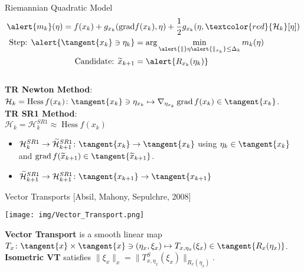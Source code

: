 \documentclass{beamer}
\begin{document}
\begin{frame}{Riemannian Quadratic Model}
    \begin{align*}
        \alert{m_k}(\eta) = f(x_k) + g_{x_k}(\operatorname{grad} & f(x_k), \eta) + \frac{1}{2} g_{x_k}(\eta, \textcolor{red}{\mathcal{H}_k} [\eta]) \\
        \text{Step: } \alert{\tangent{x_k} \ni \eta_k} & = \arg \min_{\alert{\lVert} \eta \alert{\rVert_{x_k}} \leq \Delta_k} m_k(\eta) \\
        \text{Candidate: } \widetilde{x}_{k+1} & = \alert{R_{x_k}(\eta_k)}
    \end{align*} \\[0.5\baselineskip]
    \textbf{TR Newton Method}: \\
    $\mathcal{H}_k = \operatorname{Hess} f(x_k) \colon \tangent{x_k} \ni \eta_{x_k} \mapsto \nabla_{\eta_{x_k}} \operatorname{grad} f(x_k) \in \tangent{x_k}$. \\[0.5\baselineskip]
	\textbf{TR SR1 Method}: \\
    $\mathcal{H}_k = \mathcal{H}^{SR1}_k \approx \operatorname{Hess} f(x_k)$ \\[-0.1\baselineskip]
    \begin{itemize}
        \item $\mathcal{H}^{SR1}_k \rightarrow \widetilde{\mathcal{H}}^{SR1}_{k+1} \colon \tangent{x_k} \to \tangent{x_k}$ using $\eta_k \in \tangent{x_k}$ and $\operatorname{grad}f(\widetilde{x}_{k+1}) \in \tangent{\widetilde{x}_{k+1}}$.
        \item $\widetilde{\mathcal{H}}^{SR1}_{k+1} \rightarrow \mathcal{H}^{SR1}_{k+1} \colon \tangent{x_{k+1}} \to \tangent{x_{k+1}}$
    \end{itemize}
\end{frame}

\begin{frame}{Vector Transports}
    \vspace{-1\baselineskip}\hfill{\tiny{[Absil, Mahony, Sepulchre, 2008]}}
    \begin{center}
        \texttt{[image: img/Vector\_Transport.png]}
    \end{center}
    \textbf{Vector Transport} is a smooth linear map $T_x \colon \tangent{x} \times \tangent{x} \ni (\eta_x, \xi_x) \mapsto T_{x, \eta_x}(\xi_x) \in \tangent{R_x(\eta_x)}$. \\[0.5\baselineskip]
    \textbf{Isometric VT} satisfies $\lVert \xi_x \rVert_x = \lVert T^{S}_{x, \eta_x}(\xi_x) \rVert_{R_x(\eta_x)}$.
\end{frame}
\end{document}
